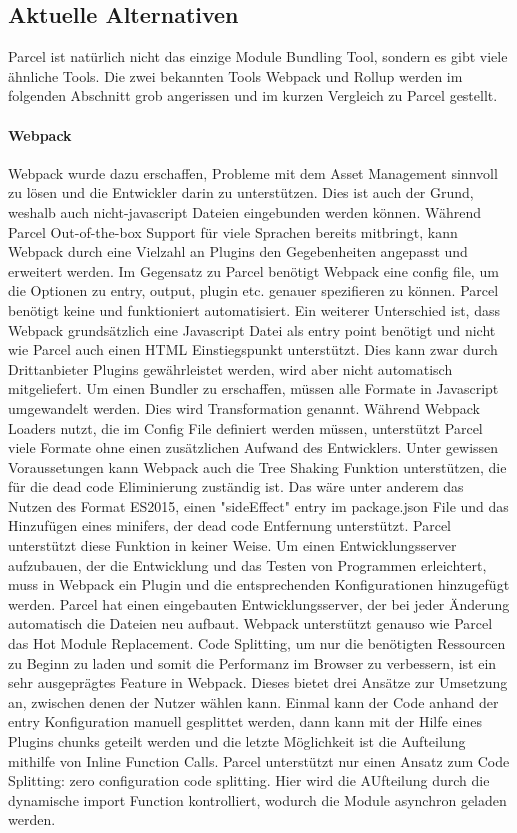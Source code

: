 \subsection{Aktuelle Alternativen}
Parcel ist natürlich nicht das einzige Module Bundling Tool, sondern es gibt viele ähnliche Tools. Die zwei bekannten Tools Webpack und Rollup werden im folgenden Abschnitt grob angerissen und im kurzen Vergleich zu Parcel gestellt.
\paragraph{Webpack} Webpack wurde dazu erschaffen, Probleme mit dem Asset Management sinnvoll zu lösen und die Entwickler darin zu unterstützen. Dies ist auch der Grund, weshalb auch nicht-javascript Dateien eingebunden werden können. Während Parcel Out-of-the-box Support für viele Sprachen bereits mitbringt, kann Webpack durch eine Vielzahl an Plugins den Gegebenheiten angepasst und erweitert werden. Im Gegensatz zu Parcel benötigt Webpack eine config file, um die Optionen zu entry, output, plugin etc. genauer spezifieren zu können. Parcel benötigt keine und funktioniert automatisiert. Ein weiterer Unterschied ist, dass Webpack grundsätzlich eine Javascript Datei als entry point benötigt und nicht wie Parcel auch einen HTML Einstiegspunkt unterstützt. Dies kann zwar durch Drittanbieter Plugins gewährleistet werden, wird aber nicht automatisch mitgeliefert. Um einen Bundler zu erschaffen, müssen alle Formate in Javascript umgewandelt werden. Dies wird Transformation genannt. Während Webpack Loaders nutzt, die im Config File definiert werden müssen, unterstützt Parcel viele Formate ohne einen zusätzlichen Aufwand des Entwicklers. Unter gewissen Voraussetungen kann Webpack auch die Tree Shaking Funktion unterstützen, die für die dead code Eliminierung zuständig ist. Das wäre unter anderem das Nutzen des Format  ES2015, einen "sideEffect" entry im package.json File und das Hinzufügen eines minifers, der dead code Entfernung unterstützt. Parcel unterstützt diese Funktion in keiner Weise. Um einen Entwicklungsserver aufzubauen, der die Entwicklung und das Testen von Programmen erleichtert, muss in Webpack ein Plugin und die entsprechenden Konfigurationen hinzugefügt werden. Parcel hat einen eingebauten Entwicklungsserver, der bei jeder Änderung automatisch die Dateien neu aufbaut. Webpack unterstützt genauso wie Parcel das Hot Module Replacement. Code Splitting, um nur die benötigten Ressourcen zu Beginn zu laden und somit die Performanz im Browser zu verbessern, ist ein sehr ausgeprägtes Feature in Webpack. Dieses bietet drei Ansätze zur Umsetzung an, zwischen denen der Nutzer wählen kann. Einmal kann der Code anhand der entry Konfiguration manuell gesplittet werden, dann kann mit der Hilfe eines Plugins chunks geteilt werden und die letzte Möglichkeit ist die Aufteilung mithilfe von Inline Function Calls. Parcel unterstützt nur einen Ansatz zum Code Splitting: zero configuration code splitting. Hier wird die AUfteilung durch die dynamische import Function kontrolliert, wodurch die Module asynchron geladen werden.
